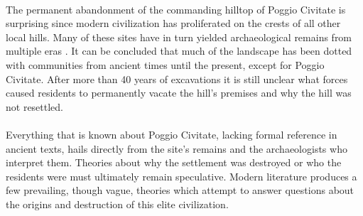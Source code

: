 \documentclass[12pt,a4paper]{thesis}
\begin{document}
\paragraph{}
The permanent abandonment of the commanding hilltop of Poggio Civitate is surprising since modern civilization has proliferated on the crests of all other local hills. Many of these sites have in turn yielded archaeological remains from multiple eras \citep{Cam01}. It can be concluded that much of the landscape has been dotted with communities from ancient times until the present, except for Poggio Civitate.  After more than 40 years of excavations it is still unclear what forces caused residents to permanently vacate the hill's premises and why the hill was not resettled.

\paragraph{}
Everything that is known about Poggio Civitate, lacking formal reference in ancient texts, hails directly from the site's remains and the archaeologists who interpret them. Theories about why the settlement was destroyed or who the residents were must ultimately remain speculative. Modern literature produces a few prevailing, though vague, theories which attempt to answer questions about the origins and destruction of this elite civilization. 
\end{document}
